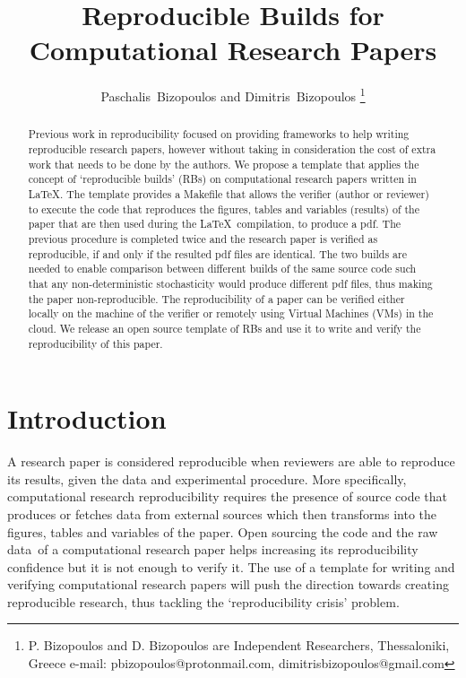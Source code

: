 \documentclass[journal]{IEEEtran}
\begin{document}

\title{Reproducible Builds for\\ Computational Research Papers}

\author{Paschalis~Bizopoulos and Dimitris~Bizopoulos
\thanks{P. Bizopoulos and D. Bizopoulos are Independent Researchers, Thessaloniki, Greece e-mail: pbizopoulos@protonmail.com, dimitrisbizopoulos@gmail.com}}

\maketitle

\begin{abstract}
	Previous work in reproducibility focused on providing frameworks to help writing reproducible research papers, however without taking in consideration the cost of extra work that needs to be done by the authors.
	We propose a template that applies the concept of `reproducible builds' (RBs) on computational research papers written in \LaTeX.
	The template provides a Makefile that allows the verifier (author or reviewer) to execute the code that reproduces the figures, tables and variables (results) of the paper that are then used during the \LaTeX\ compilation, to produce a pdf.
	The previous procedure is completed twice and the research paper is verified as reproducible, if and only if the resulted pdf files are identical.
	The two builds are needed to enable comparison between different builds of the same source code such that any non-deterministic stochasticity would produce different pdf files, thus making the paper non-reproducible.
	The reproducibility of a paper can be verified either locally on the machine of the verifier or remotely using Virtual Machines (VMs) in the cloud.
	We release an open source template of RBs and use it to write and verify the reproducibility of this paper.
\end{abstract}

\section{Introduction}
A research paper is considered reproducible when reviewers are able to reproduce its results, given the data and experimental procedure.
More specifically, computational research reproducibility requires the presence of source code that produces or fetches data from external sources which then transforms into the figures, tables and variables of the paper.
Open sourcing the code and the raw data of a computational research paper helps increasing its reproducibility confidence but it is not enough to verify it.
The use of a template for writing and verifying computational research papers will push the direction towards creating reproducible research, thus tackling the `reproducibility crisis' problem.
\end{document}

